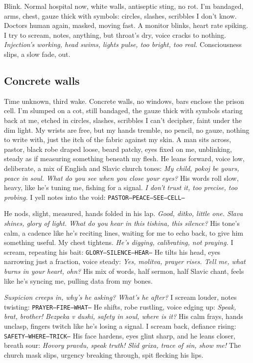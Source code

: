 \documentclass[12pt,oneside]{book}
\newcommand{\note}[1]{\texttt{#1}}
\begin{document}
Blink. Normal hospital now, white walls, antiseptic sting, no rot. I’m bandaged, arms, chest, gauze thick with symbols: circles, slashes, scribbles I don’t know. Doctors human again, masked, moving fast. A monitor blinks, heart rate spiking. I try to scream, notes, anything, but throat’s dry, voice cracks to nothing. \textit{Injection’s working, head swims, lights pulse, too bright, too real.} Consciousness slips, a slow fade, out.

\subsection*{Concrete walls}
Time unknown, third wake. Concrete walls, no windows, bars enclose the prison cell. I’m slumped on a cot, still bandaged, the gauze thick with symbols staring back at me, etched in circles, slashes, scribbles I can’t decipher, faint under the dim light. My wrists are free, but my hands tremble, no pencil, no gauze, nothing to write with, just the itch of the fabric against my skin. A man sits across, pastor, black robe draped loose, beard patchy, eyes fixed on me, unblinking, steady as if measuring something beneath my flesh. He leans forward, voice low, deliberate, a mix of English and Slavic church tones: \textit{My child, pokoj be yours, peace in soul. What do you see when you close your eyes?} His words roll slow, heavy, like he’s tuning me, fishing for a signal. \textit{I don’t trust it, too precise, too probing.} I yell notes into the void: \note{PASTOR—PEACE—SEE—CELL—}

He nods, slight, measured, hands folded in his lap. \textit{Good, ditko, little one. Slava shines, glory of light. What do you hear in this tishina, this silence?} His tone’s calm, a cadence like he’s reciting lines, waiting for me to echo back, to give him something useful. My chest tightens. \textit{He’s digging, calibrating, not praying.} I scream, repeating his bait: \note{GLORY—SILENCE—HEAR—} He tilts his head, eyes narrowing just a fraction, voice steady: \textit{Yes, molitva, prayer rises. Tell me, what burns in your heart, ohn?} His mix of words, half sermon, half Slavic chant, feels like he’s syncing me, pulling data from my bones.

\textit{Suspicion creeps in, why’s he asking? What’s he after?} I scream louder, notes twisting: \note{PRAYER—FIRE—WHAT—} He shifts, robe rustling, voice edging up: \textit{Speak, brat, brother! Bezpeka v dushi, safety in soul, where is it?} His calm frays, hands unclasp, fingers twitch like he’s losing a signal. I scream back, defiance rising: \note{SAFETY—WHERE—TRICK—} His face hardens, eyes glint sharp, and he leans closer, breath sour: \textit{Hovory pravdu, speak truth! Slid grixa, trace of sin, show me!} The church mask slips, urgency breaking through, spit flecking his lips.
\end{document}
